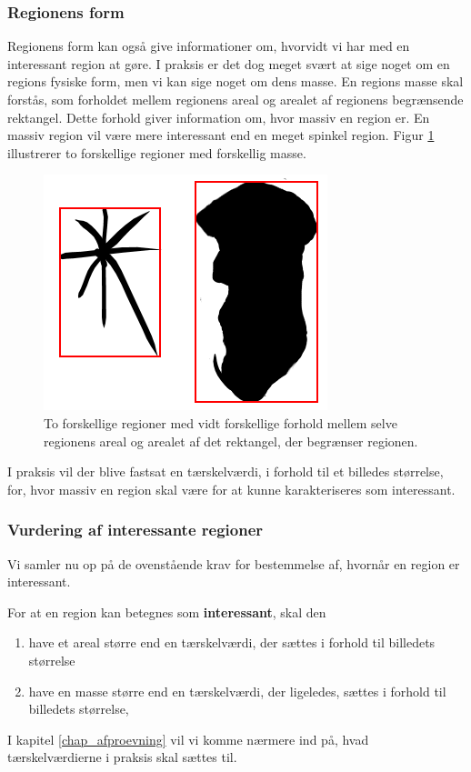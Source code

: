 {\subsubsection{Regionens form}
Regionens form kan også give informationer om, hvorvidt vi har med en
interessant region at gøre.  I praksis er det dog meget svært at sige
noget om en regions fysiske form, men vi kan sige noget om dens masse.
En regions masse skal forstås, som forholdet mellem regionens areal og
arealet af regionens begrænsende rektangel.  Dette forhold giver
information om, hvor massiv en region er.  En massiv region vil være
mere interessant end en meget spinkel region.  Figur \ref{region_mass}
illustrerer to forskellige regioner med forskellig masse.
\begin{figure}[h]
    \begin{center}
        \includegraphics[scale=\imgscale,angle=0]{afsnit/vores_implementation/billeder/naiv_algoritme/bbox_area_ratio}
    \end{center}
    \caption[Regioners masse]{To forskellige regioner med vidt forskellige forhold
    mellem selve regionens areal og arealet af det rektangel, der
    begrænser regionen.}
    \label{region_mass}
\end{figure}
I praksis vil der blive fastsat en tærskelværdi, i forhold til et
billedes størrelse, for, hvor massiv en region skal være for at kunne
karakteriseres som interessant.

\subsubsection{Vurdering af interessante regioner}
Vi samler nu op på de ovenstående krav for bestemmelse af, hvornår en
region er interessant.

\begin{definition}
    For at en region kan betegnes som \textbf{interessant}, skal den
    \begin{enumerate}\label{naiv_regler}
            \renewcommand{\labelenumi}{(\alph{enumi})}
        \item have et areal større end en tærskelværdi, der sættes i
            forhold til billedets størrelse
        \item have en masse større end en tærskelværdi, der ligeledes,
            sættes i forhold til billedets størrelse,
    \end{enumerate}
    \label{def_interessant}
\end{definition}
I kapitel \ref{chap_afproevning} vil vi komme nærmere ind på, hvad
tærskelværdierne i praksis skal sættes til.

}

